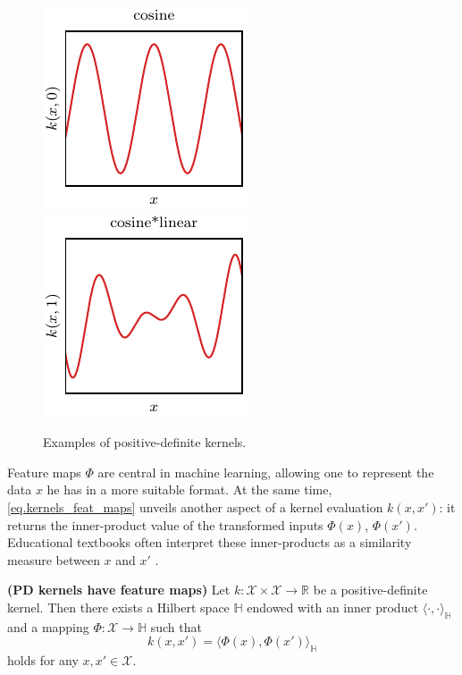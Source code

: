 \begin{figure}[t]
	\includegraphics{../images/chap2_kernel_cs.pdf} \hspace{3pt}
	\includegraphics{../images/chap2_kernel_csli.pdf} 
	\caption{Examples of positive-definite kernels.}
	\label{fig.pd_kernels}
\end{figure}


Feature maps $\Phi$ are central in machine learning, allowing one to represent the data $x$ he has in a more suitable format. At the same time, \eqref{eq.kernels_feat_maps} unveils another aspect of a kernel evaluation $k(x,x')$: it returns the inner-product value of the transformed inputs $\Phi(x)$, $\Phi(x')$. Educational textbooks often interpret these inner-products as a similarity measure between $x$ and $x'$ \citep{scholkopf2002learning}.

\begin{proposition}
	\label{thm.pd_kernels_feature_maps}
	\textbf{(PD kernels have feature maps)} 
	Let $k:\mathcal{X} \times \mathcal{X} \rightarrow \mathbb{R} $ be a positive-definite kernel. Then there exists a Hilbert space $\mathbb{H}$ endowed with an inner product $\langle \cdot,\cdot \rangle_\mathbb{H}$ and a mapping $\Phi :  \mathcal{X} \rightarrow \mathbb{H}$ such that 
	\begin{equation}
		\label{eq.kernels_feat_maps}
		k(x,x') = \langle \Phi(x),\Phi(x') \rangle_\mathbb{H}
	\end{equation}
	holds for any $x,x' \in \mathcal{X}$.
\end{proposition}

